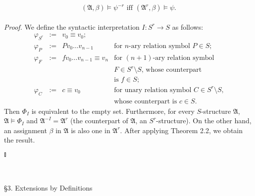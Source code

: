 \begin{enumerate}[1.]
\begin{enumerate}
{\[
\mbox{$(\mathfrak{A}, \beta) \models \psi^{-r}$ iff $(\mathfrak{A}^r, \beta) \models \psi$}.
\]}
\\
\textit{Proof.} We define the syntactic interpretation $I : S^r \rightarrow S$ as follows:
\[
\begin{array}{llll}
\varphi_{S^r} & := & v_0 \equiv v_0; & \  \\
\varphi_P     & := & Pv_0 \ldots v_{n-1} & \mbox{for $n$-ary relation symbol $P \in S$}; \\
\varphi_F     & := & fv_0 \ldots v_{n-1} \equiv v_n & \mbox{for $(n+1)$-ary relation symbol} \\
\             & \  & \                              & \mbox{$F \in S^r \setminus S$, whose counterpart} \\
\             & \  & \                              & \mbox{is $f \in S$}; \\
\varphi_C     & := & c \equiv v_0 & \mbox{for unary relation symbol $C \in S^r \setminus S$,}\\
\             & \  & \            & \mbox{whose counterpart is $c \in S$}.
\end{array}
\]
Then $\Phi_I$ is equivalent to the empty set. Furthermore, for every $S$-structure $\mathfrak{A}$, $\mathfrak{A} \models \Phi_I$ and $\mathfrak{A}^{-I} = \mathfrak{A}^r$ (the counterpart of $\mathfrak{A}$, an $S^r$-structure). On the other hand, an assignment $\beta$ in $\mathfrak{A}$ is also one in $\mathfrak{A}^r$. After applying Theorem 2.2, we obtain the result.
\end{enumerate} \begin{flushright}$\talloblong$\end{flushright}
\end{enumerate}
\
\\
\\
{\large \S3. Extensions by Definitions}

